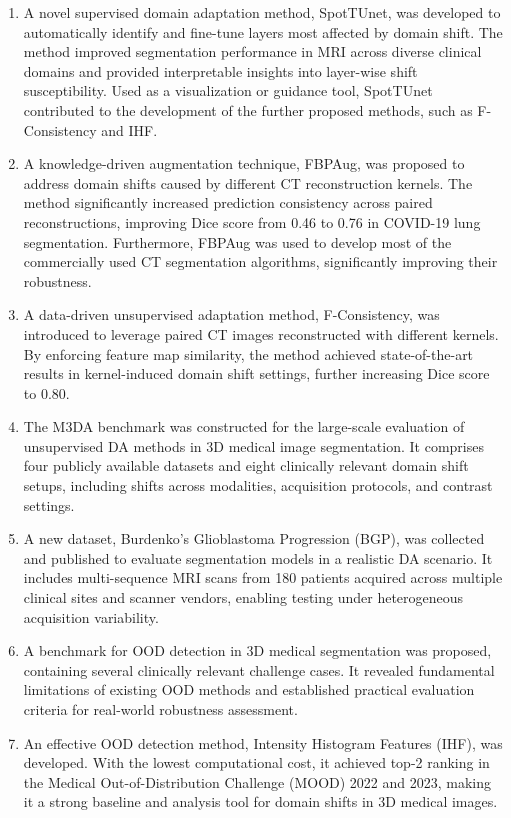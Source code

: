 \begin{enumerate}
	
	\item A novel supervised domain adaptation method, SpotTUnet, was developed to automatically identify and fine-tune layers most affected by domain shift. The method improved segmentation performance in MRI across diverse clinical domains and provided interpretable insights into layer-wise shift susceptibility. Used as a visualization or guidance tool, SpotTUnet contributed to the development of the further proposed methods, such as F-Consistency and IHF.
	\item A knowledge-driven augmentation technique, FBPAug, was proposed to address domain shifts caused by different CT reconstruction kernels. The method significantly increased prediction consistency across paired reconstructions, improving Dice score from 0.46 to 0.76 in COVID-19 lung segmentation. Furthermore, FBPAug was used to develop most of the commercially used CT segmentation algorithms, significantly improving their robustness.
	\item A data-driven unsupervised adaptation method, F-Consistency, was introduced to leverage paired CT images reconstructed with different kernels. By enforcing feature map similarity, the method achieved state-of-the-art results in kernel-induced domain shift settings, further increasing Dice score to 0.80.
	\item The M3DA benchmark was constructed for the large-scale evaluation of unsupervised DA methods in 3D medical image segmentation. It comprises four publicly available datasets and eight clinically relevant domain shift setups, including shifts across modalities, acquisition protocols, and contrast settings.
	\item A new dataset, Burdenko’s Glioblastoma Progression (BGP), was collected and published to evaluate segmentation models in a realistic DA scenario. It includes multi-sequence MRI scans from 180 patients acquired across multiple clinical sites and scanner vendors, enabling testing under heterogeneous acquisition variability.
	\item A benchmark for OOD detection in 3D medical segmentation was proposed, containing several clinically relevant challenge cases. It revealed fundamental limitations of existing OOD methods and established practical evaluation criteria for real-world robustness assessment.
	\item An effective OOD detection method, Intensity Histogram Features (IHF), was developed. With the lowest computational cost, it achieved top-2 ranking in the Medical Out-of-Distribution Challenge (MOOD) 2022 and 2023, making it a strong baseline and analysis tool for domain shifts in 3D medical images.


\end{enumerate}
